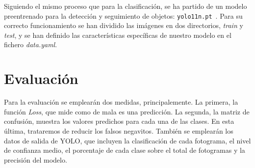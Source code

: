 \documentclass[12pt]{report} %
\begin{document}
    Siguiendo el mismo proceso que para la clasificación, se ha partido de un modelo preentrenado para la detección y seguimiento de objetos: \texttt{yolo11n.pt}~\cite{yolo11n}. Para su correcto funcionamiento se han dividido las imágenes en dos directorios, \textit{train} y \textit{test}, y se han definido las características específicas de nuestro modelo en el fichero \textit{data.yaml}. 

    

    \section{Evaluación}

    Para la evaluación se emplearán dos medidas, principalemente. La primera,
    la función \textit{Loss}, que mide como de mala es una predicción. La
    segunda, la matriz de confusión, muestra los valores predichos para cada
    una de las clases. En esta última, trataremos de reducir los falsos
    negavitos. También se emplearán los datos de salida de YOLO, que incluyen
    la clasificación de cada fotograma, el nivel de confianza medio, el
    porcentaje de cada clase sobre el total de fotogramas y la precisión del
    modelo.
\end{document}

